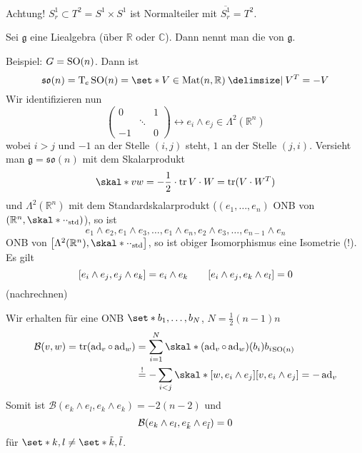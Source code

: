 Achtung! $S^1_r \subset T^2 = S^1 \times S^1$ ist Normalteiler mit $\overline{S^1_r}= T^2$.

\begin{definition}[{name=[Killingform]}]
	Sei $\mathfrak{g}$ eine Liealgebra (über $\mathbb{R}$ oder $\mathbb{C}$).
	Dann nennt man 
	die  von $\mathfrak{g}$.
\end{definition}

Beispiel: $G=\operatorname{SO}(n)$.
Dann ist 
\[
	\mathfrak{so}(n) = \Tmap_e\SO(n) = \set*{V \in \Mat(n,\mathbb{R}) \given V^T=-V}
\]
Wir identifizieren nun 
\[
	\begin{pmatrix}
		0 & & 1 \\
		& \ddots & \\
		-1 & & 0
	\end{pmatrix} \longleftrightarrow e_i \wedge e_j \in \Lambda^2(\mathbb{R}^n)
\]
wobei $i > j$ und $-1$ an der Stelle $(i,j)$ steht, $1$ an der Stelle $(j,i)$.
Versieht man $\mathfrak{g} = \mathfrak{so}(n)$ mit dem Skalarprodukt
\[
	\skal*{v}{w} = - \frac{1}{2}  \cdot \tr{V \cdot W} = \tr(V \cdot W^T)
\]
und $\Lambda^2(\mathbb{R}^n)$ mit dem Standardskalarprodukt ($(e_1,\ldots ,e_n)$ ONB von $\enbrace*{\mathbb{R}^n, \skal*{\cdot}{\cdot}_{\mathrm{std}}}$), so ist
\[
	e_1 \wedge e_2, e_1 \wedge e_3, \ldots , e_1 \wedge e_n, e_2 \wedge e_3, \ldots , e_{n-1} \wedge e_n
\]
ONB von $\benbrace*{\Lambda^2(\mathbb{R}^n), \skal*{\cdot}{\cdot}_{\mathrm{std}}}$, so ist obiger Isomorphismus eine Isometrie (!).
Es gilt
\[
	\benbrace*{e_i \wedge e_j , e_j \wedge e_k} = e_i \wedge e_k \qquad \benbrace*{e_i \wedge e_j, e_k \wedge e_l}= 0
\]
(nachrechnen)

Wir erhalten für eine ONB $\set*{b_1, \ldots ,b_N}$, $N=\frac{1}{2}(n-1)n$
\begin{align}
	\mathcal{B}(v,w) = \tr \enbrace*{\ad_v \circ \ad_w} &= \sum_{i=1}^{N} \skal*{(\ad_v \circ \ad_w)(b_i)}{b_i}_{\SO(n)} \\
	&\stackrel{!}{=} -\sum_{i<j} \skal*{ \benbrace*{w,e_i \wedge e_j}}{ \benbrace*{v, e_i \wedge e_j}} = - \ad_v
\end{align}
Somit ist $\mathcal{B}(e_k \wedge e_l, e_k \wedge e_k)=-2(n-2)$ und
\[
	\mathcal{B} \enbrace*{e_k \wedge e_l, e_{\tilde{k}} \wedge e_{\tilde{l}}} =0
\]
für $\set*{k,l} \neq \set*{\tilde{k},\tilde{l}}$.

